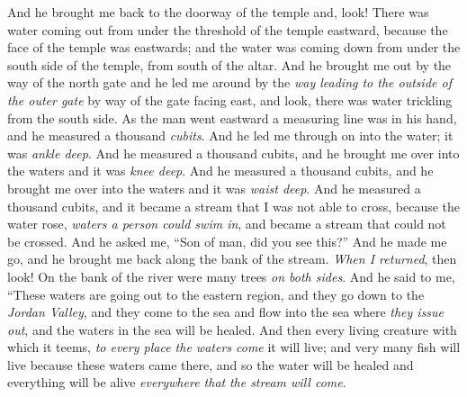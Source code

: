 \begin{biblechapter} %
 And he brought me back to the doorway of the temple and, look! There was water coming out from under the threshold of the temple eastward, because the face of the temple was eastwards; and the water was coming down from under the south side of the temple, from south of the altar.
\verse And he brought me out by the way of the north gate and he led me around by the \textit{way leading to the outside of the outer gate} by way of the gate facing east, and look, there was water trickling from the south side.
\verse As the man went eastward a measuring line was in his hand, and he measured a thousand \textit{cubits}. And he led me through on into the water; it was \textit{ankle deep}.
\verse And he measured a thousand cubits, and he brought me over into the waters and it was \textit{knee deep}. And he measured a thousand cubits, and he brought me over into the waters and it was \textit{waist deep}.
\verse And he measured a thousand cubits, and it became a stream that I was not able to cross, because the water rose, \textit{waters a person could swim in}, and became a stream that could not be crossed.
\verse And he asked me, “Son of man, did you see this?” And he made me go, and he brought me back along the bank of the stream.
\verse \textit{When I returned}, then look! On the bank of the river were many trees \textit{on both sides}.
\verse And he said to me, “These waters are going out to the eastern region, and they go down to the \textit{Jordan Valley}, and they come to the sea and flow into the sea where \textit{they issue out}, and the waters in the sea will be healed.
\verse And then every living creature with which it teems, \textit{to every place the waters come} it will live; and very many fish will live because these waters came there, and so the water will be healed and everything will be alive \textit{everywhere that} \textit{the stream will come}.

\end{biblechapter}
